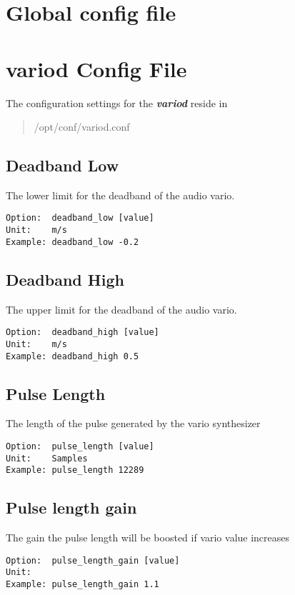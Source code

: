 \section{Global config file}

\section{variod Config File}

The configuration settings for the \textbf{\textit{variod}} reside in 
\begin{quote}
	/opt/conf/variod.conf
\end{quote}

\subsection{Deadband Low}
The lower limit for the deadband of the audio vario.
\begin{lstlisting}
Option:  deadband_low [value]
Unit:    m/s
Example: deadband_low -0.2
\end{lstlisting}

\subsection{Deadband High}
The upper limit for the deadband of the audio vario.
\begin{lstlisting}
Option:  deadband_high [value]
Unit:    m/s
Example: deadband_high 0.5
\end{lstlisting}

\subsection{Pulse Length}
The length of the pulse generated by the vario synthesizer
\begin{lstlisting}
Option:  pulse_length [value]
Unit:    Samples
Example: pulse_length 12289
\end{lstlisting}

\subsection{Pulse length gain}
The gain the pulse length will be boosted if vario value increases
\begin{lstlisting}
Option:  pulse_length_gain [value]
Unit:    
Example: pulse_length_gain 1.1
\end{lstlisting}

